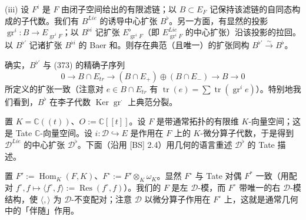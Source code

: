 (iii) 设 $F^{i}$ 是 $F$ 由闭子空间给出的有限滤链；以 $B\subset E_{F}$ 记保持该滤链的自同态构成的子代数。我们有%
$B^{Lie}$ 的诱导中心扩张 $B^{\flat}$。另一方面，有显然的投影 $\operatorname{gr}^{i}:B\to E_{\operatorname{gr}^{i}F}$；以 $B^{\flat i}$ 记扩张 $E^{\flat}_{\operatorname{gr}^{i}F}$（即 $E^{Lie}_{\operatorname{gr}^{i}F}$ 的中心扩张）沿该投影的拉回。以 $B^{\flat'}$ 记诸扩张 $B^{\flat i}$ 的 Baer 和。则存在典范（且唯一）的扩张同构 $B^{\flat'}\xrightarrow{\sim}B^{\flat}$。

确实，$B^{\flat'}$ 与 (373) 的精确子序列
\[
0\to B\cap E_{tr}\to(B\cap E_+)\oplus(B\cap E_-)\to B\to 0
\]
所定义的扩张一致（注意对 $e\in B\cap E_{tr}$ 有 $\operatorname{tr}(e)=\sum\operatorname{tr}(\operatorname{gr}^{i}e)$）。特别地我们看到，$B^{\flat}$ 在李子代数 $\operatorname{Ker}\operatorname{gr}^{\cdot}$ 上典范分裂。

 置 $K=\mathbb{C}((t))$、$O:=\mathbb{C}[[t]]$。设 $F$ 是带通常拓扑的有限维 $K$-向量空间；这是 Tate $\mathbb{C}$-向量空间。设 $i:\mathcal{D}\hookrightarrow E$ 是作用在 $F$ 上的 $K$-微分算子代数，于是得到 $\mathcal{D}^{Lie}$ 的中心扩张 $\mathcal{D}^{\flat}$。下面（沿用 [BS] 2.4）用几何的语言重述 $\mathcal{D}^{\flat}$ 的 Tate 描述。

置 $F':=\operatorname{Hom}_{K}(F,K)$、$F^{\circ}:=F'\otimes_{K}\omega_{K}$。显然 $F^{\circ}$ 与 Tate 对偶 $F^{*}$ 一致（用配对 $f^{\circ},f\mapsto\langle f^{\circ},f\rangle:=\operatorname{Res}(f^{\circ},f)$）。我们的 $F$ 是左 $\mathcal{D}$-模，而 $F^{\circ}$ 带唯一的右 $\mathcal{D}$-模结构，使 $\langle,\rangle$ 为 $\mathcal{D}$-不变配对；注意 $\mathcal{D}$ 以微分算子作用在 $F^{\circ}$ 上，这就是通常几何中的「伴随」作用。

